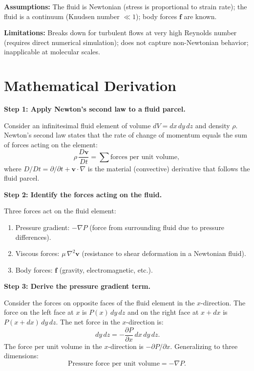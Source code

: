 \textbf{Assumptions:} The fluid is Newtonian (stress is proportional to strain rate); the fluid is a continuum (Knudsen number $\ll 1$); body forces $\mathbf{f}$ are known.


\textbf{Limitations:} Breaks down for turbulent flows at very high Reynolds number (requires direct numerical simulation); does not capture non-Newtonian behavior; inapplicable at molecular scales.


\section*{Mathematical Derivation}

\textbf{Step 1: Apply Newton's second law to a fluid parcel.}

Consider an infinitesimal fluid element of volume $dV = dx\,dy\,dz$ and density $\rho$. Newton's second law states that the rate of change of momentum equals the sum of forces acting on the element:
\begin{equation}
\rho\,\frac{D\mathbf{v}}{Dt} = \sum \text{forces per unit volume},
\end{equation}
where $D/Dt = \partial/\partial t + \mathbf{v}\cdot\nabla$ is the material (convective) derivative that follows the fluid parcel.

\textbf{Step 2: Identify the forces acting on the fluid.}

Three forces act on the fluid element:
\begin{enumerate}
\item Pressure gradient: $-\nabla P$ (force from surrounding fluid due to pressure differences).
\item Viscous forces: $\mu\,\nabla^{2}\mathbf{v}$ (resistance to shear deformation in a Newtonian fluid).
\item Body forces: $\mathbf{f}$ (gravity, electromagnetic, etc.).
\end{enumerate}

\textbf{Step 3: Derive the pressure gradient term.}

Consider the forces on opposite faces of the fluid element in the $x$-direction. The force on the left face at $x$ is $P(x)\,dy\,dz$ and on the right face at $x+dx$ is $P(x+dx)\,dy\,dz$. The net force in the $x$-direction is:
\begin{equation}
[P(x) - P(x+dx)]\,dy\,dz = -\frac{\partial P}{\partial x}\,dx\,dy\,dz.
\end{equation}
The force per unit volume in the $x$-direction is $-\partial P/\partial x$. Generalizing to three dimensions:
\begin{equation}
\text{Pressure force per unit volume} = -\nabla P.
\end{equation}

